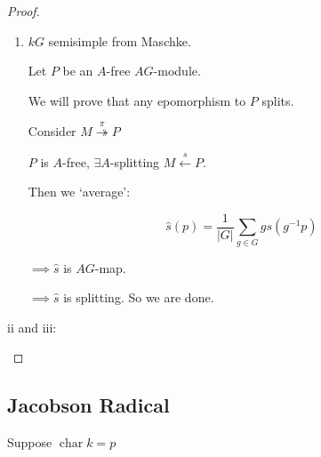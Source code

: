 \documentclass{article}
\theoremstyle{definition}
\begin{document}
\begin{proof}
    \begin{enumerate}[label=\roman*)]
        \item \(kG\) semisimple from Maschke.
        
        Let \(P\) be an \(A\)-free \(AG\)-module.

        We will prove that any epomorphism to \(P\) splits.

        Consider \(M \overset{\pi}{\twoheadrightarrow} P\) 

        \(P\) is \(A\)-free, \(\exists A\)-splitting \(M \overset{s}{\leftarrow} P\).
        
        Then we `average':

        \[
            \widehat{s}(p) = \frac{1}{\vert G \vert} \sum_{g\in G} g s (g ^{-1} p)
        \]

        \(\implies \widehat{s}\) is \(AG\)-map.

        \(\implies \widehat{s}\) is splitting. So we are done.
    \end{enumerate} 

    ii and iii:

    \begin{center}
    \end{center}


\end{proof}

\subsection*{Jacobson Radical}

Suppose \(\operatorname{char} k = p\)
\end{document}
